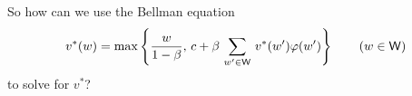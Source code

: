 \begin{frame}

    So how can we use the Bellman equation
    \begin{equation*}
        v^*(w) = 
        \max \left\{
            \frac{w}{1-\beta}
            ,\,
            c + \beta \, \sum_{w' \in \mathsf W} \, v^*(w') \varphi(w')
            \right\}
            \qquad (w \in \mathsf W)
    \end{equation*}
    to solve for $v^*$?


\end{frame}
















